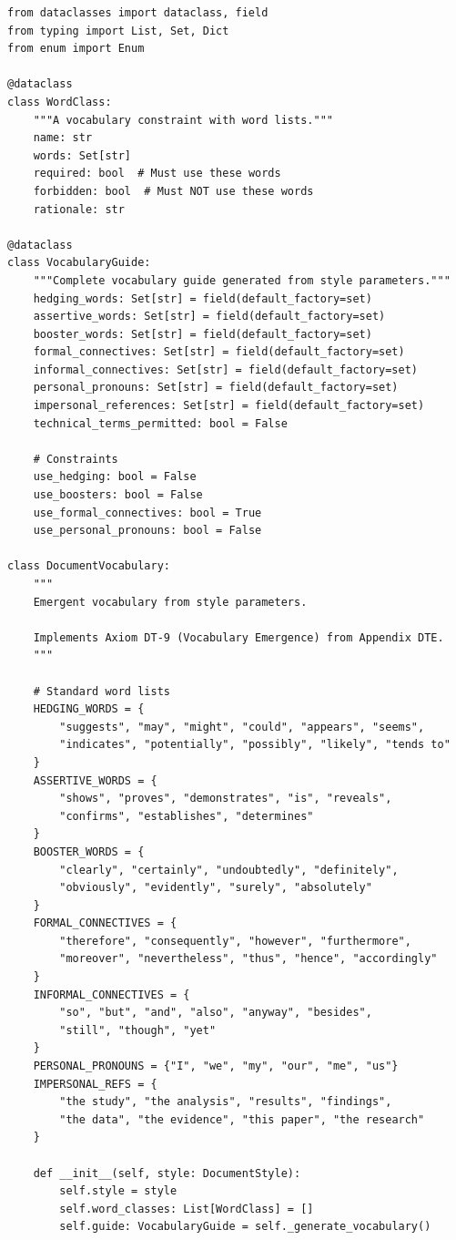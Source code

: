 \begin{verbatim}
from dataclasses import dataclass, field
from typing import List, Set, Dict
from enum import Enum

@dataclass
class WordClass:
    """A vocabulary constraint with word lists."""
    name: str
    words: Set[str]
    required: bool  # Must use these words
    forbidden: bool  # Must NOT use these words
    rationale: str

@dataclass
class VocabularyGuide:
    """Complete vocabulary guide generated from style parameters."""
    hedging_words: Set[str] = field(default_factory=set)
    assertive_words: Set[str] = field(default_factory=set)
    booster_words: Set[str] = field(default_factory=set)
    formal_connectives: Set[str] = field(default_factory=set)
    informal_connectives: Set[str] = field(default_factory=set)
    personal_pronouns: Set[str] = field(default_factory=set)
    impersonal_references: Set[str] = field(default_factory=set)
    technical_terms_permitted: bool = False

    # Constraints
    use_hedging: bool = False
    use_boosters: bool = False
    use_formal_connectives: bool = True
    use_personal_pronouns: bool = False

class DocumentVocabulary:
    """
    Emergent vocabulary from style parameters.

    Implements Axiom DT-9 (Vocabulary Emergence) from Appendix DTE.
    """

    # Standard word lists
    HEDGING_WORDS = {
        "suggests", "may", "might", "could", "appears", "seems",
        "indicates", "potentially", "possibly", "likely", "tends to"
    }
    ASSERTIVE_WORDS = {
        "shows", "proves", "demonstrates", "is", "reveals",
        "confirms", "establishes", "determines"
    }
    BOOSTER_WORDS = {
        "clearly", "certainly", "undoubtedly", "definitely",
        "obviously", "evidently", "surely", "absolutely"
    }
    FORMAL_CONNECTIVES = {
        "therefore", "consequently", "however", "furthermore",
        "moreover", "nevertheless", "thus", "hence", "accordingly"
    }
    INFORMAL_CONNECTIVES = {
        "so", "but", "and", "also", "anyway", "besides",
        "still", "though", "yet"
    }
    PERSONAL_PRONOUNS = {"I", "we", "my", "our", "me", "us"}
    IMPERSONAL_REFS = {
        "the study", "the analysis", "results", "findings",
        "the data", "the evidence", "this paper", "the research"
    }

    def __init__(self, style: DocumentStyle):
        self.style = style
        self.word_classes: List[WordClass] = []
        self.guide: VocabularyGuide = self._generate_vocabulary()


\end{verbatim}
